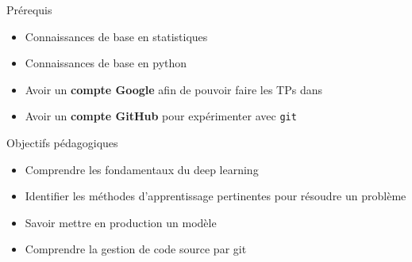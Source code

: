
\begin{frame}{Prérequis}
  \begin{itemize}
  \item Connaissances de base en statistiques
  \item Connaissances de base en python
  \item Avoir un \textbf{compte Google} afin de pouvoir faire les TPs dans 
  \item Avoir un \textbf{compte GitHub} pour expérimenter avec \texttt{git}
  \end{itemize}
\end{frame}

\begin{frame}{Objectifs pédagogiques}
  \begin{itemize}
  \item Comprendre les fondamentaux du deep learning
  \item Identifier les méthodes d'apprentissage pertinentes pour résoudre un problème
  \item Savoir mettre en production un modèle
  \item Comprendre la gestion de code source par git
  \end{itemize}
\end{frame}
